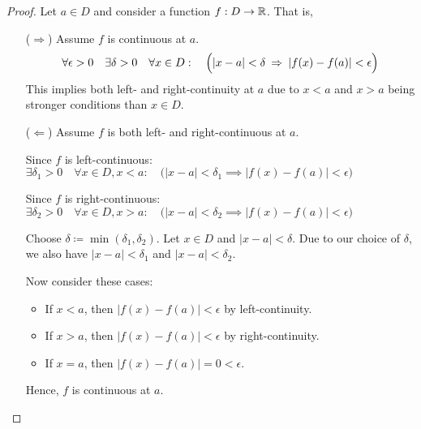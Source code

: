 \begin{proof}
    Let $a \in D$ and consider a function $f : D \to \R$. That is,

    \begin{itemize}
    \item[($\Rightarrow$)] Assume $f$ is continuous at $a$.
        \begin{align*}
            \forall \epsilon > 0 \quad \exists \delta > 0
            \quad \forall x \in D: \quad
            \Bigl(|x - a| < \delta \: \implies \: |f(x) - f(a)| < \epsilon \Bigr)
        \end{align*}
        This implies both left- and right-continuity at $a$ due to $x < a$ and $x > a$ being stronger conditions than $x \in D$.

    \item[($\Leftarrow$)] Assume $f$ is both left- and right-continuous at $a$.
    
        Since $f$ is left-continuous: $\exists \delta_1 > 0 \quad
        \forall x \in D, x < a: \quad
        \bigl(|x - a| < \delta_1 \implies |f(x) - f(a)| < \epsilon\bigr)$

        Since $f$ is right-continuous: $\exists \delta_2 > 0 \quad
        \forall x \in D, x > a: \quad
        \bigl(|x - a| < \delta_2 \implies |f(x) - f(a)| < \epsilon\bigr)$

        Choose $\delta \coloneqq \min(\delta_1, \delta_2)$. Let $x \in D$ and $|x - a| < \delta$. Due to our choice of $\delta$, we also have $|x-a| < \delta_1$ and $|x-a| < \delta_2$.
        
        Now consider these cases:

        \begin{itemize}
            \item If $x < a$, then $|f(x) - f(a)| < \epsilon$ by left-continuity.
            \item If $x > a$, then $|f(x) - f(a)| < \epsilon$ by right-continuity.
            \item If $x = a$, then $|f(x) - f(a)| = 0 < \epsilon$.
        \end{itemize}

        Hence, $f$ is continuous at $a$.
    \end{itemize}
\end{proof}

